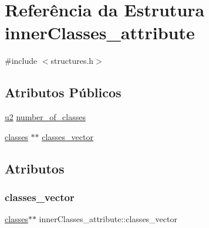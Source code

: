 \hypertarget{structinnerClasses__attribute}{}\section{Referência da Estrutura inner\+Classes\+\_\+attribute}
\label{structinnerClasses__attribute}


{\ttfamily \#include $<$structures.\+h$>$}

\subsection*{Atributos Públicos}
\begin{DoxyCompactItemize}
\item 
\hyperlink{lista__operandos_8h_a732cde1300aafb73b0ea6c2558a7a54f}{u2} \hyperlink{structinnerClasses__attribute_a5025605be4999db69f5cf0309fa1e443}{number\+\_\+of\+\_\+classes}
\item 
\hyperlink{structclasses}{classes} $\ast$$\ast$ \hyperlink{structinnerClasses__attribute_a0179ecaaf1ae3febfc8553dcfb278679}{classes\+\_\+vector}
\end{DoxyCompactItemize}


\subsection{Atributos}
\mbox{\label{structinnerClasses__attribute_a0179ecaaf1ae3febfc8553dcfb278679}} 
\subsubsection{\texorpdfstring{classes\+\_\+vector}{classes\_vector}}
{\footnotesize\ttfamily \hyperlink{structclasses}{classes}$\ast$$\ast$ inner\+Classes\+\_\+attribute\+::classes\+\_\+vector}

\mbox{\label{structinnerClasses__attribute_a5025605be4999db69f5cf0309fa1e443}} 
